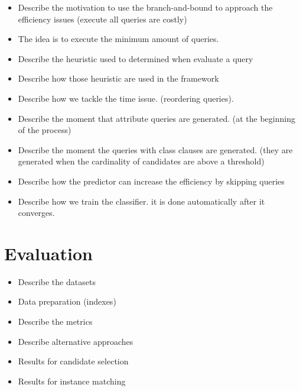 \begin{itemize}
\item Describe the motivation to use the branch-and-bound to approach the efficiency issues (execute all queries are costly)
\item The idea is to execute the minimum amount of queries.
\item Describe the heuristic used to determined when evaluate a query
\item Describe how those heuristic are used in the framework
\item Describe how we tackle the time issue.  (reordering queries).
\item Describe the moment  that attribute queries are generated. (at the beginning of the process)
\item Describe the moment the queries with class clauses are generated. (they are generated when the cardinality of candidates are above a threshold)
\item Describe how the predictor can increase the efficiency by skipping queries
\item Describe how we train the classifier. it is done automatically after it converges.
\end{itemize}


\section{Evaluation}

\begin{itemize}

\item Describe the datasets
\item Data preparation (indexes)
\item Describe the metrics
\item Describe alternative approaches
\item Results for candidate selection
\item Results for instance matching

\end{itemize}



 

